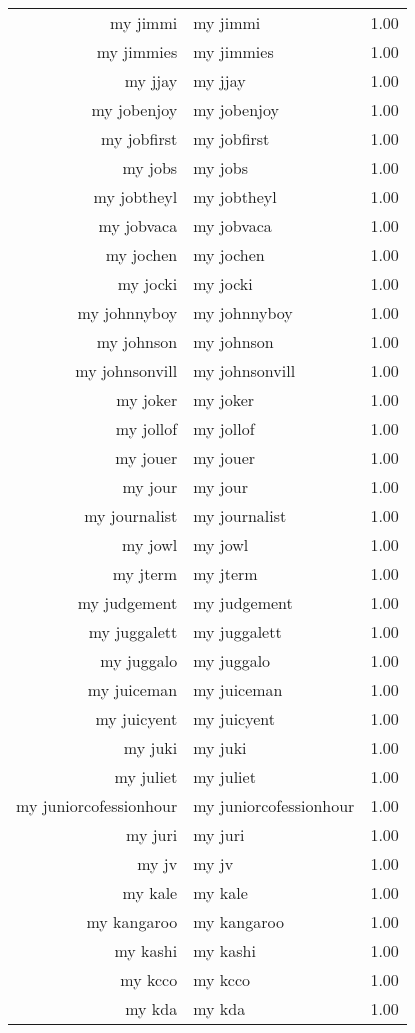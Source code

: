\begin{table}[ht]
\begin{tabular}{rlr}
  my jimmi & my jimmi & 1.00 \\ 
  my jimmies & my jimmies & 1.00 \\ 
  my jjay & my jjay & 1.00 \\ 
  my jobenjoy & my jobenjoy & 1.00 \\ 
  my jobfirst & my jobfirst & 1.00 \\ 
  my jobs & my jobs & 1.00 \\ 
  my jobtheyl & my jobtheyl & 1.00 \\ 
  my jobvaca & my jobvaca & 1.00 \\ 
  my jochen & my jochen & 1.00 \\ 
  my jocki & my jocki & 1.00 \\ 
  my johnnyboy & my johnnyboy & 1.00 \\ 
  my johnson & my johnson & 1.00 \\ 
  my johnsonvill & my johnsonvill & 1.00 \\ 
  my joker & my joker & 1.00 \\ 
  my jollof & my jollof & 1.00 \\ 
  my jouer & my jouer & 1.00 \\ 
  my jour & my jour & 1.00 \\ 
  my journalist & my journalist & 1.00 \\ 
  my jowl & my jowl & 1.00 \\ 
  my jterm & my jterm & 1.00 \\ 
  my judgement & my judgement & 1.00 \\ 
  my juggalett & my juggalett & 1.00 \\ 
  my juggalo & my juggalo & 1.00 \\ 
  my juiceman & my juiceman & 1.00 \\ 
  my juicyent & my juicyent & 1.00 \\ 
  my juki & my juki & 1.00 \\ 
  my juliet & my juliet & 1.00 \\ 
  my juniorcofessionhour & my juniorcofessionhour & 1.00 \\ 
  my juri & my juri & 1.00 \\ 
  my jv & my jv & 1.00 \\ 
  my kale & my kale & 1.00 \\ 
  my kangaroo & my kangaroo & 1.00 \\ 
  my kashi & my kashi & 1.00 \\ 
  my kcco & my kcco & 1.00 \\ 
  my kda & my kda & 1.00 \\ 

\end{tabular}
\end{table}
